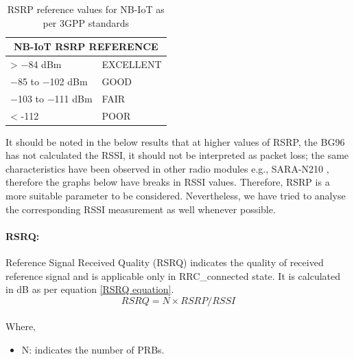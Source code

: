 \documentclass[12pt]{article}
\begin{document}
\begin{table}[h]
\caption {RSRP reference values for NB-IoT as per 3GPP standards \cite{3GPP,sikora2019performance}}
\centering

\begin{tabular}{|p{5cm}|p{5cm}|}
\hline
\multicolumn{2}{|c|}{NB-IoT RSRP REFERENCE} \\ \hline
> −84 dBm                            & EXCELLENT                    \\ \hline
−85 to −102 dBm                      & GOOD                         \\ \hline
−103 to −111 dBm                     & FAIR                         \\ \hline
< -112                               & POOR                         \\ \hline
\end{tabular}
\label{nbiotRSRP}
\end{table}




It should be noted in the below results that at higher values of RSRP, the BG96 has not calculated the RSSI, it should not be interpreted as packet loss; the same characteristics have been observed in other radio modules e.g., SARA-N210 \cite{basu2019experimental}, therefore the graphs below have breaks in RSSI values. Therefore, RSRP is a more suitable parameter to be considered. Nevertheless, we have tried to analyse the corresponding RSSI measurement as well whenever possible.

\paragraph{RSRQ:}
Reference Signal Received Quality (RSRQ) indicates the quality of received reference signal and is applicable only in RRC\_connected state. It is calculated in dB as per equation \ref{RSRQ equation}. 
\begin{equation}
     RSRQ= {{N\times} RSRP/ RSSI}
     \label{RSRQ equation}
\end{equation}
\\ Where,
\begin{itemize}
    \item N: indicates the number of PRBs.
\end{itemize}
\end{document}
